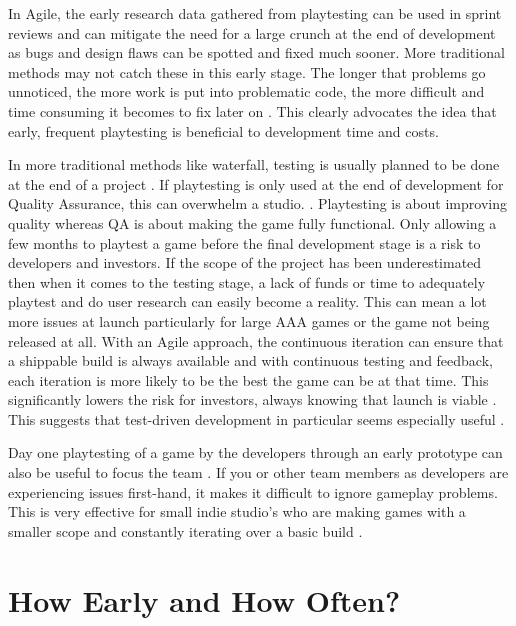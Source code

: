 \documentclass{scrartcl}
\begin{document}
In Agile, the early research data gathered from playtesting can be used in sprint reviews and can mitigate the need for a large crunch at the end of development as bugs and design flaws can be spotted and fixed much sooner\cite{PMKOA:4}. More traditional methods may not catch these in this early stage. The longer that problems go unnoticed, the more work is put into problematic code, the more difficult and time consuming it becomes to fix later on \cite{GDCOTC:5}. This clearly advocates the idea that early, frequent playtesting is beneficial to development time and costs. \par
In more traditional methods like waterfall, testing is usually planned to be done at the end of a project \cite{ji2011comparing:6}. If playtesting is only used at the end of development for Quality Assurance, this can overwhelm a studio.  \cite{PMTrine:7}. Playtesting is about improving quality whereas QA is about making the game fully functional. Only allowing a few months to playtest a game before the final development stage is a risk to developers and investors. If the scope of the project has been underestimated then when it comes to the testing stage, a lack of funds or time to adequately playtest and do user research can easily become a reality\cite{PMZZ:8}. This can mean a lot more issues at launch particularly for large AAA games \cite{BrokenGames:9} or the game not being released at all. With an Agile approach, the continuous iteration can ensure that a shippable build is always available and with continuous testing and feedback, each iteration is more likely to be the best the game can be at that time. This significantly lowers the risk for investors, always knowing that launch is viable \cite{ghane2017quantitative:10}. This suggests that test-driven development in particular seems especially useful \cite{cunningham2005costs:11}. \par
Day one playtesting of a game by the developers through an early prototype can also be useful to focus the team \cite{Yampolsky:2016:LGD:2896958.2896965:12}. If you or other team members as developers are experiencing issues first-hand, it makes it difficult to ignore gameplay problems. This is very effective for small indie studio's who are making games with a smaller scope and constantly iterating over a basic build \cite{PMNS2:13}.


\section{How Early and How Often?}
\end{document}
